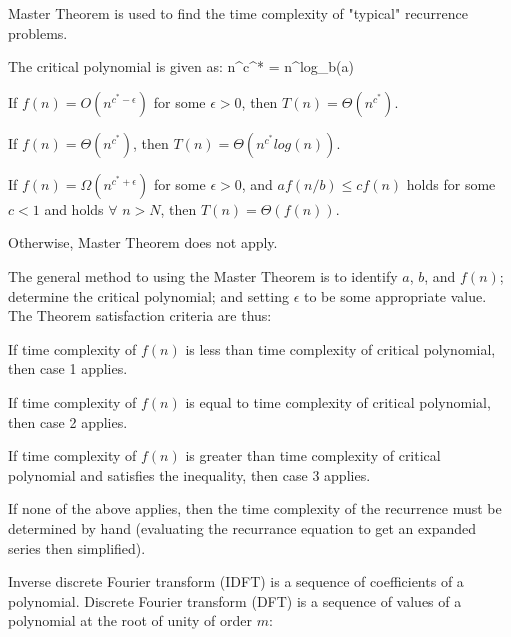 
        Master Theorem is used to find the time complexity of "typical" recurrence problems.

        The critical polynomial is given as:
        \startformula n^{c^{*}} = n^{log_{b}(a)} \stopformula

        \startitemize[n]
            \item If $f(n) = O(n^{c^{*} - \epsilon})$ for some $\epsilon > 0$, then $T(n) = \Theta(n^{c^{*}})$.
            \item If $f(n) = \Theta(n^{c^{*}})$, then $T(n) = \Theta(n^{c^{*}}log(n))$.
            \item If $f(n) = \Omega(n^{c^{*} + \epsilon})$ for some $\epsilon > 0$, and $af(n/b) \leq cf(n)$ holds for some $c < 1$ and holds $\forall$ $n > N$, then $T(n) = \Theta(f(n))$.
            \item Otherwise, Master Theorem does not apply.
        \stopitemize

        The general method to using the Master Theorem is to identify $a$, $b$, and $f(n)$; determine the critical polynomial; and setting $\epsilon$ to be some appropriate value. The Theorem satisfaction criteria are thus:
        \startitemize
            \item If time complexity of $f(n)$ is less than time complexity of critical polynomial, then case 1 applies.
            \item If time complexity of $f(n)$ is equal to time complexity of critical polynomial, then case 2 applies.
            \item If time complexity of $f(n)$ is greater than time complexity of critical polynomial and satisfies the inequality, then case 3 applies.
            \item If none of the above applies, then the time complexity of the recurrence must be determined by hand (evaluating the recurrance equation to get an expanded series then simplified).
        \stopitemize

\subject{Fast Fourier Transform} %

    Inverse discrete Fourier transform (IDFT) is a sequence of coefficients of a polynomial. Discrete Fourier transform (DFT) is a sequence of values of a polynomial at the root of unity of order $m$:
    \startformula{}\stopformula

